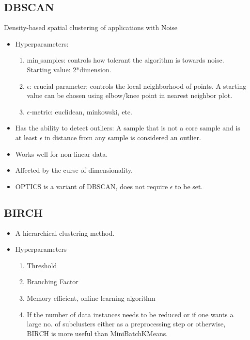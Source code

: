 \documentclass[a4paper, 12pt]{report}
\begin{document}
\subsection{DBSCAN}
Density-based spatial clustering of applications with Noise
\begin{itemize}
\item Hyperparameters: 
\begin{enumerate}
\item min$\_$samples: controls how tolerant the algorithm is towards noise. Starting value: 2*dimension.
\item$\epsilon$: crucial parameter; controls the local neighborhood of points. A starting value can be chosen using elbow/knee point in nearest neighbor plot.
\item $\epsilon$-metric: euclidean, minkowski, etc.
\end{enumerate}
\item Has the ability to detect outliers: A sample that is not a core sample and is at least $\epsilon$ in distance from any sample is considered an outlier.
\item Works well for non-linear data.
\item Affected by the curse of dimensionality.
\item OPTICS is a variant of DBSCAN, does not require $\epsilon$ to be set.
\end{itemize}

\subsection{BIRCH}
\begin{itemize}
\item A hierarchical clustering method.
\item Hyperparameters
\begin{enumerate}
\item Threshold
\item Branching Factor
\item Memory efficient, online learning algorithm
\item If the number of data instances needs to be reduced or if one wants a large no. of subclusters either as a preprocessing step or otherwise, BIRCH is more useful than MiniBatchKMeans.
\end{enumerate}
\end{itemize}
\end{document}
